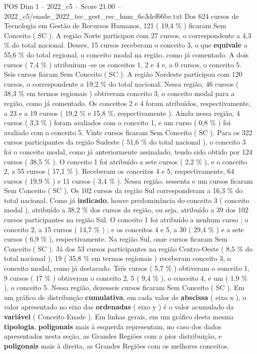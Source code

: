 \begin{textsample}{POS Dim 1 – 2022\_c5 – Score 21.00 – 2022\_c5/enade\_2022\_tec\_gest\_rec\_hum\_6c3def66be.txt}
Dos 624 cursos de Tecnologia em Gestão de Recursos Humanos, 121 ( 19,4 \% ) ficaram Sem Conceito ( SC ).
A região Norte participou com 27 cursos, o correspondente a 4,3 \% do total nacional.
Desses, 15 cursos receberam o conceito 3, o que \textbf{equivale} a 55,6 \% do total regional, o conceito modal na região, como já comentado.
A dois cursos ( 7,4 \% ) atribuíram -se os conceitos 1, 2 e 4 e, a 0 cursos, o conceito 5.
Seis cursos fiaram Sem Conceito ( SC ).
A região Nordeste participou com 120 cursos, o correspondente a 19,2 \% do total nacional.
Nessa região, 46 cursos ( 38,3 \% em termos regionais ) obtiveram conceito 3, o conceito modal para a região, como já comentado.
Os conceitos 2 e 4 foram atribuídos, respectivamente, a 23 e a 19 cursos ( 19,2 \% e 15,8 \%, respectivamente ).
Ainda nessa região, 4 cursos ( 3,3 \% ) foram avaliados com o conceito 1, e um curso ( 0,8 \% ) foi avaliado com o conceito 5.
Vinte cursos ficaram Sem Conceito ( SC ).
Para os 322 cursos participantes da região Sudeste ( 51,6 \% do total nacional ), o conceito 3 foi o conceito modal, como já anteriormente assinalado, tendo sido obtido por 124 cursos ( 38,5 \% ).
O conceito 1 foi atribuído a sete cursos ( 2,2 \% ), e o conceito 2, a 55 cursos ( 17,1 \% ).
Receberam os conceitos 4 e 5, respectivamente, 64 cursos ( 19,9 \% ) e 11 cursos ( 3,4 \% ).
Nessa região, sessenta e um cursos ficaram Sem Conceito ( SC ).
Os 102 cursos da região Sul corresponderam a 16,3 \% do total nacional.
Como já \textbf{indicado}, houve predominância do conceito 3 ( conceito modal ), atribuído a 38,2 \% dos cursos da região, ou seja, atribuído a 39 dos 102 cursos participantes na região Sul.
O conceito 1 foi atribuído a nenhum curso ; o conceito 2, a 15 cursos ( 14,7 \% ) ; e os conceitos 4 e 5, a 30 ( 29,4 \% ) e a sete cursos ( 6,9 \% ), respectivamente.
Na região Sul, onze cursos ficaram Sem Conceito ( SC ).
Já dos 53 cursos participantes na região Centro-Oeste ( 8,5 \% do total nacional ), 19 ( 35,8 \% em termos regionais ) receberam conceito 3, o conceito modal, como já destacado.
Três cursos ( 5,7 \% ) obtiveram o conceito 1, 9 cursos ( 17 \% ) obtiveram o conceito 2, 5 ( 9,4 \% ), o conceito 4, e um ( 1,9 \% ), o conceito 5.
Nessa região, dezesseis cursos ficaram Sem Conceito ( SC ).
Em um gráfico de distribuição \textbf{cumulativa}, em cada valor de \textbf{abscissa} ( eixo x ), o valor apresentado no eixo das \textbf{ordenadas} ( eixo y ) é o valor acumulado da \textbf{variável} ( Conceito Enade ).
Em linhas gerais, em um gráfico desta mesma \textbf{tipologia}, \textbf{poligonais} mais à esquerda representam, no caso dos dados apresentados nesta seção, as Grandes Regiões com a pior distribuição, e \textbf{poligonais} mais à direita, as Grandes Regiões com os melhores conceitos.

\end{textsample}
